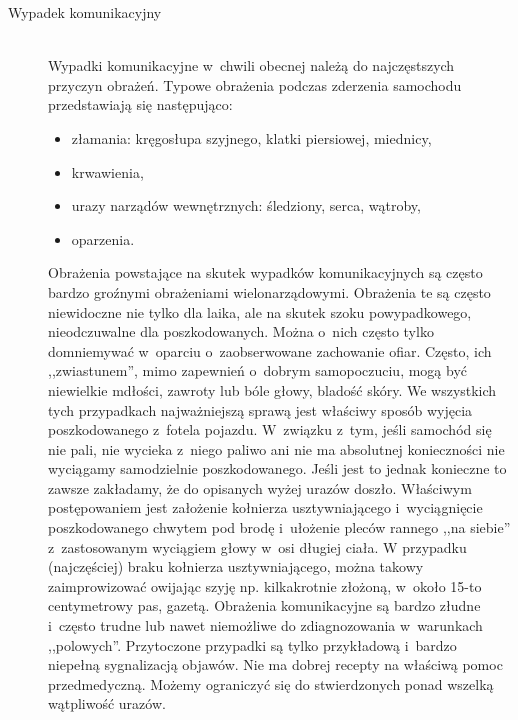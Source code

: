 \documentclass[a5paper,10pt,titlepage,twoside]{article}
\begin{document}
\begin{description}
\begin{itemize}
\end{itemize}
\item[Wypadek komunikacyjny] \hfill \\ Wypadki komunikacyjne w~chwili obecnej należą do najczęstszych przyczyn obrażeń. Typowe obrażenia podczas zderzenia samochodu przedstawiają się następująco:
\begin{itemize}
\item złamania: kręgosłupa szyjnego, klatki piersiowej, miednicy,
\item krwawienia,
\item urazy narządów wewnętrznych: śledziony, serca, wątroby,
\item oparzenia.
\end{itemize}
Obrażenia powstające na skutek wypadków komunikacyjnych są często bardzo groźnymi obrażeniami wielonarządowymi. Obrażenia te są często niewidoczne nie tylko dla laika, ale na skutek szoku powypadkowego, nieodczuwalne dla poszkodowanych. Można o~nich często tylko domniemywać w~oparciu o~zaobserwowane zachowanie ofiar. Często, ich ,,zwiastunem'', mimo zapewnień o~dobrym samopoczuciu, mogą być niewielkie mdłości, zawroty lub bóle głowy, bladość skóry. We wszystkich tych przypadkach najważniejszą sprawą jest właściwy sposób wyjęcia poszkodowanego z~fotela pojazdu. W~związku z~tym, jeśli samochód się nie pali, nie wycieka z~niego paliwo ani nie ma absolutnej konieczności nie wyciągamy samodzielnie poszkodowanego. Jeśli jest to jednak  konieczne to zawsze zakładamy, że do opisanych wyżej urazów doszło. Właściwym postępowaniem jest założenie kołnierza usztywniającego i~wyciągnięcie poszkodowanego chwytem pod brodę i~ułożenie pleców rannego ,,na siebie'' z~zastosowanym wyciągiem głowy w~osi długiej ciała. W przypadku (najczęściej) braku kołnierza usztywniającego, można takowy zaimprowizować owijając szyję np. kilkakrotnie złożoną, w~około 15-to centymetrowy pas, gazetą. Obrażenia komunikacyjne są bardzo złudne i~często trudne lub nawet niemożliwe do zdiagnozowania w~warunkach ,,polowych''. Przytoczone przypadki są tylko przykładową i~bardzo niepełną sygnalizacją objawów. Nie ma dobrej recepty na właściwą pomoc przedmedyczną. Możemy ograniczyć się do stwierdzonych ponad wszelką wątpliwość urazów.


\end{description}
\end{document}
